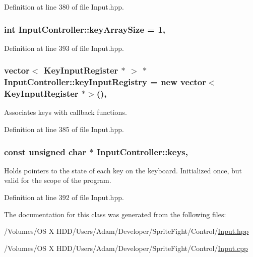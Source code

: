 Definition at line 380 of file Input.\-hpp.

\hypertarget{class_input_controller_a95bfc98ab2e37c9772b678e9b561c97d}{
\subsubsection[{key\-Array\-Size}]{\setlength{\rightskip}{0pt plus 5cm}int Input\-Controller\-::key\-Array\-Size = 1\hspace{0.3cm}{\ttfamily [static]}, {\ttfamily [protected]}}}\label{class_input_controller_a95bfc98ab2e37c9772b678e9b561c97d}


Definition at line 393 of file Input.\-hpp.

\hypertarget{class_input_controller_a2e26dc4af1946fa78c817f2bd3f4a319}{
\subsubsection[{key\-Input\-Registry}]{\setlength{\rightskip}{0pt plus 5cm}vector$<$ {\bf Key\-Input\-Register} $\ast$ $>$ $\ast$ Input\-Controller\-::key\-Input\-Registry = new vector$<${\bf Key\-Input\-Register} $\ast$$>$()\hspace{0.3cm}{\ttfamily [static]}, {\ttfamily [protected]}}}\label{class_input_controller_a2e26dc4af1946fa78c817f2bd3f4a319}
Associates keys with callback functions. 

Definition at line 385 of file Input.\-hpp.

\hypertarget{class_input_controller_a17d54f67ffd783a8fca81a94a6de02e7}{
\subsubsection[{keys}]{\setlength{\rightskip}{0pt plus 5cm}const unsigned char $\ast$ Input\-Controller\-::keys\hspace{0.3cm}{\ttfamily [static]}, {\ttfamily [protected]}}}\label{class_input_controller_a17d54f67ffd783a8fca81a94a6de02e7}
Holds pointers to the state of each key on the keyboard. Initialized once, but valid for the scope of the program. 

Definition at line 392 of file Input.\-hpp.



The documentation for this class was generated from the following files\-:\begin{DoxyCompactItemize}
\item 
/\-Volumes/\-O\-S X H\-D\-D/\-Users/\-Adam/\-Developer/\-Sprite\-Fight/\-Control/\hyperlink{_input_8hpp}{Input.\-hpp}\item 
/\-Volumes/\-O\-S X H\-D\-D/\-Users/\-Adam/\-Developer/\-Sprite\-Fight/\-Control/\hyperlink{_input_8cpp}{Input.\-cpp}\end{DoxyCompactItemize}
